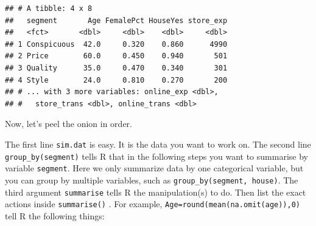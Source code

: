 \documentclass[12pt,]{krantz}
\newenvironment{Shaded}{\begin{snugshade}}{\end{snugshade}}
\newcommand{\KeywordTok}[1]{\textcolor[rgb]{0.13,0.29,0.53}{\textbf{#1}}}
\newcommand{\DataTypeTok}[1]{\textcolor[rgb]{0.13,0.29,0.53}{#1}}
\newcommand{\DecValTok}[1]{\textcolor[rgb]{0.00,0.00,0.81}{#1}}
\newcommand{\FloatTok}[1]{\textcolor[rgb]{0.00,0.00,0.81}{#1}}
\newcommand{\StringTok}[1]{\textcolor[rgb]{0.31,0.60,0.02}{#1}}
\newcommand{\OperatorTok}[1]{\textcolor[rgb]{0.81,0.36,0.00}{\textbf{#1}}}
\newcommand{\NormalTok}[1]{#1}
\theoremstyle{definition}
\theoremstyle{definition}
\theoremstyle{definition}
\theoremstyle{remark}
\begin{document}
\begin{Shaded}
\end{Shaded}

\begin{verbatim}
## # A tibble: 4 x 8
##   segment       Age FemalePct HouseYes store_exp
##   <fct>       <dbl>     <dbl>    <dbl>     <dbl>
## 1 Conspicuous  42.0     0.320    0.860      4990
## 2 Price        60.0     0.450    0.940       501
## 3 Quality      35.0     0.470    0.340       301
## 4 Style        24.0     0.810    0.270       200
## # ... with 3 more variables: online_exp <dbl>,
## #   store_trans <dbl>, online_trans <dbl>
\end{verbatim}

Now, let's peel the onion in order.

The first line \texttt{sim.dat} is easy. It is the data you want to work
on. The second line \texttt{group\_by(segment)} tells R that in the
following steps you want to summarise by variable \texttt{segment}. Here
we only summarize data by one categorical variable, but you can group by
multiple variables, such as \texttt{group\_by(segment,\ house)}. The
third argument \texttt{summarise} tells R the manipulation(s) to do.
Then list the exact actions inside \texttt{summarise()} . For example,
\texttt{Age=round(mean(na.omit(age)),0)} tell R the following things:
\end{document}
